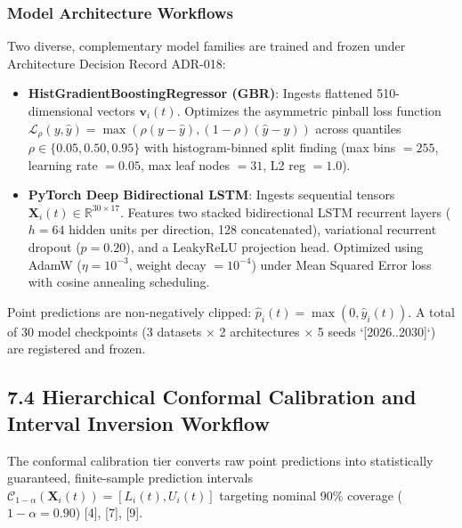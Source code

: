 \documentclass[12pt,a4paper]{article}
\begin{document}
\subsubsection*{Model Architecture Workflows}
Two diverse, complementary model families are trained and frozen under Architecture Decision Record ADR-018:
\begin{itemize}
    \item \textbf{HistGradientBoostingRegressor (GBR)}: Ingests flattened 510-dimensional vectors $\mathbf{v}_i(t)$. Optimizes the asymmetric pinball loss function $\mathcal{L}_{\rho}(y, \hat{y}) = \max(\rho(y - \hat{y}), (1 - \rho)(\hat{y} - y))$ across quantiles $\rho \in \{0.05, 0.50, 0.95\}$ with histogram-binned split finding (max bins $= 255$, learning rate $= 0.05$, max leaf nodes $= 31$, L2 reg $= 1.0$).
    \item \textbf{PyTorch Deep Bidirectional LSTM}: Ingests sequential tensors $\mathbf{X}_i(t) \in \mathbb{R}^{30 \times 17}$. Features two stacked bidirectional LSTM recurrent layers ($h = 64$ hidden units per direction, 128 concatenated), variational recurrent dropout ($p = 0.20$), and a LeakyReLU projection head. Optimized using AdamW ($\eta = 10^{-3}$, weight decay $= 10^{-4}$) under Mean Squared Error loss with cosine annealing scheduling.
\end{itemize}
Point predictions are non-negatively clipped: $\hat{p}_i(t) = \max(0, \hat{y}_i(t))$. A total of 30 model checkpoints (3 datasets $\times$ 2 architectures $\times$ 5 seeds `[2026..2030]`) are registered and frozen.

\subsection*{7.4 Hierarchical Conformal Calibration and Interval Inversion Workflow}
The conformal calibration tier converts raw point predictions into statistically guaranteed, finite-sample prediction intervals $\mathcal{C}_{1-\alpha}(\mathbf{X}_i(t)) = [L_i(t), U_i(t)]$ targeting nominal 90\% coverage ($1 - \alpha = 0.90$) [4], [7], [9].
\end{document}
